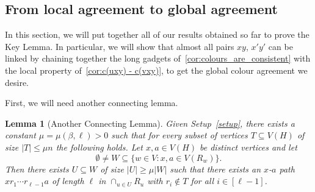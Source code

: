 \documentclass[A4paper,12pt]{article}
\newtheorem{lem}[thm]{Lemma}
\theoremstyle{definition}
\begin{document}
\subsection{From local agreement to global agreement}\label{sec:puttingtogether}

In this section, we will put together all of our results obtained so far to prove the Key Lemma. In particular, we will show that almost all pairs $xy$, $x'y'$ can be linked by chaining together the long gadgets of~\cref{cor:colours_are_consistent} with the local property of~\cref{cor:c(uxy) - c(vxy)}, to get the global colour agreement we desire.

First, we will need another connecting lemma.

\begin{lem}[Another Connecting Lemma]
\label{lem:anotherconnecting}
Given Setup~\ref{setup}, there exists a constant $\mu=\mu(\beta,\ell)>0$ such that 
for every subset of vertices $T\subseteq V(H)$ of size $|T|\leq \mu n$ the following holds.  
Let $x,a\in V(H)$ be distinct vertices and let 
$$
\emptyset \neq W\subseteq \{w\in V: x,a\in V(R_w)\}.
$$
Then there exists $U\subseteq W$ of size $|U|\geq  \mu |W|$ such that there exists an $x$-$a$ path $xr_1\cdots r_{\ell-1}a$ of length $\ell$ in $\cap_{u\in U} R_u$ with $r_i\notin T$ for all $i\in[\ell-1]$.
\end{lem}
\end{document}
